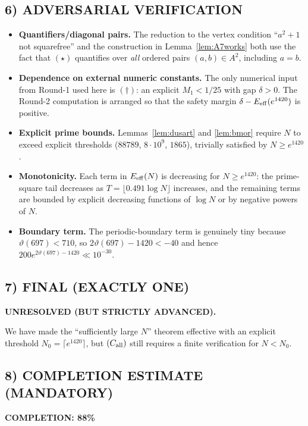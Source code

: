\subsection*{6) ADVERSARIAL VERIFICATION}
\begin{itemize}
\item \textbf{Quantifiers/diagonal pairs.} The reduction to the vertex condition ``$a^2+1$ not squarefree'' and the construction in Lemma~\ref{lem:A7works} both use the fact that $(\star)$ quantifies over \emph{all} ordered pairs $(a,b)\in A^2$, including $a=b$.
\item \textbf{Dependence on external numeric constants.} The only numerical input from Round-1 used here is $(\dagger)$: an explicit $M_1<1/25$ with gap $\delta>0$.  The Round-2 computation is arranged so that the safety margin $\delta-E_{\rm eff}(e^{1420})$ is positive.
\item \textbf{Explicit prime bounds.} Lemmas~\ref{lem:dusart} and \ref{lem:bmor} require $N$ to exceed explicit thresholds ($88789$, $8\cdot 10^9$, $1865$), trivially satisfied by $N\ge e^{1420}$.
\item \textbf{Monotonicity.} Each term in $E_{\rm eff}(N)$ is decreasing for $N\ge e^{1420}$: the prime-square tail decreases as $T=\lfloor 0.491\log N\rfloor$ increases, and the remaining terms are bounded by explicit decreasing functions of $\log N$ or by negative powers of $N$.
\item \textbf{Boundary term.} The periodic-boundary term is genuinely tiny because $\vartheta(697)<710$, so $2\vartheta(697)-1420<-40$ and hence $200e^{2\vartheta(697)-1420}\ll 10^{-30}$.
\end{itemize}

\subsection*{7) FINAL (EXACTLY ONE)}
\textbf{UNRESOLVED (BUT STRICTLY ADVANCED).}

\smallskip
\noindent We have made the ``sufficiently large $N$'' theorem effective with an explicit threshold $N_0=\lceil e^{1420}\rceil$, but $(C_{\rm all})$ still requires a finite verification for $N<N_0$.

\subsection*{8) COMPLETION ESTIMATE (MANDATORY)}
\textbf{COMPLETION: 88\%}

